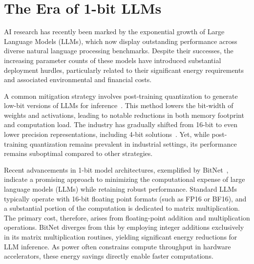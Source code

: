 \begin{abstract}
The emergence of 1-bit Large Language Models (LLMs), as showcased by recent advancements like BitNet~\cite{bitnet}, signals a transformative phase in LLM development. In this study, we present a new 1-bit LLM variant, referred to as \textbf{}, wherein each parameter (or weight) is assigned one of three values from the ternary set \{-1, 0, 1\}. This model achieves parity with its full-precision Transformer LLM counterparts (i.e., FP16 or BF16) of equivalent size and training data, both in perplexity and downstream task results, while offering substantial advantages in terms of reduced latency, decreased memory consumption, greater throughput, and lower energy demands. More importantly, the 1.58-bit LLM establishes a novel scaling law and provides a framework for training the next generation of LLMs that achieve an optimal balance between effectiveness and efficiency. In addition, this approach introduces a new computational paradigm and paves the way for hardware innovations specifically tailored for 1-bit LLMs.
\end{abstract}

\section{The Era of 1-bit LLMs}

AI research has recently been marked by the exponential growth of Large Language Models (LLMs), which now display outstanding performance across diverse natural language processing benchmarks. Despite their successes, the increasing parameter counts of these models have introduced substantial deployment hurdles, particularly related to their significant energy requirements and associated environmental and financial costs.

A common mitigation strategy involves post-training quantization to generate low-bit versions of LLMs for inference~\cite{smoothquant, gptq, quip, quip_sharp}. This method lowers the bit-width of weights and activations, leading to notable reductions in both memory footprint and computation load. The industry has gradually shifted from 16-bit to even lower precision representations, including 4-bit solutions~\cite{gptq, awq}. Yet, while post-training quantization remains prevalent in industrial settings, its performance remains suboptimal compared to other strategies.

Recent advancements in 1-bit model architectures, exemplified by BitNet~\cite{bitnet}, indicate a promising approach to minimizing the computational expense of large language models (LLMs) while retaining robust performance. Standard LLMs typically operate with 16-bit floating point formats (such as FP16 or BF16), and a substantial portion of the computation is dedicated to matrix multiplication. The primary cost, therefore, arises from floating-point addition and multiplication operations. BitNet diverges from this by employing integer additions exclusively in its matrix multiplication routines, yielding significant energy reductions for LLM inference. As power often constrains compute throughput in hardware accelerators, these energy savings directly enable faster computations.

